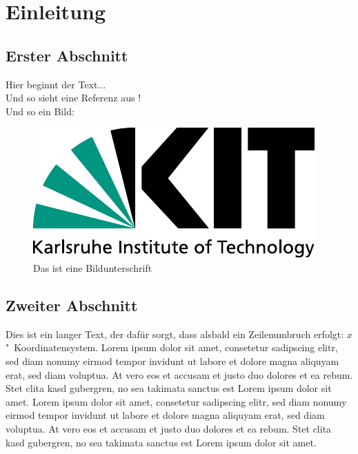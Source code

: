 









\chapter{Einleitung}
\label{ch:Introduction}

\section{Erster Abschnitt}
Hier beginnt der Text...\\
%
Und so sieht eine Referenz aus \cite{becker2008a}!\\[3em]

%
Und so ein Bild:\\
\begin{figure}[h]
  \begin{center}
    \includegraphics[width=.3\textwidth]{logos/KITLogo_RGB.pdf}
    \caption{Das ist eine Bildunterschrift}
  \end{center}
\end{figure}

\section{Zweiter Abschnitt}

Dies ist ein langer Text, der dafür sorgt, dass alsbald ein Zeilenumbruch erfolgt: $x$"~Koordinatensystem. Lorem ipsum dolor sit amet, consetetur sadipscing elitr, sed diam nonumy eirmod tempor invidunt ut labore et dolore magna aliquyam erat, sed diam voluptua. At vero eos et accusam et justo duo dolores et ea rebum. Stet clita kasd gubergren, no sea takimata sanctus est Lorem ipsum dolor sit amet. Lorem ipsum dolor sit amet, consetetur sadipscing elitr, sed diam nonumy eirmod tempor invidunt ut labore et dolore magna aliquyam erat, sed diam voluptua. At vero eos et accusam et justo duo dolores et ea rebum. Stet clita kasd gubergren, no sea takimata sanctus est Lorem ipsum dolor sit amet.



